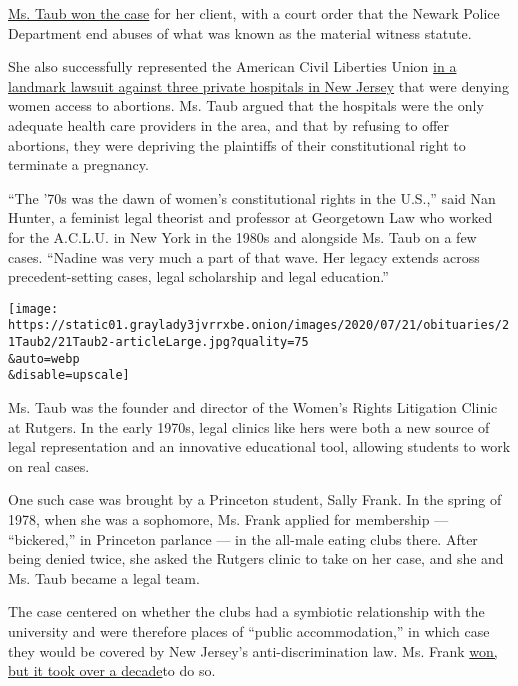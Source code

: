 \href{https://www.nytimes3xbfgragh.onion/1976/11/23/archives/court-moves-to-curb-witnesslaw-abuses-ruling-in-case-of-rape-victim.html}{Ms.
Taub won the case} for her client, with a court order that the Newark
Police Department end abuses of what was known as the material witness
statute.

She also successfully represented the American Civil Liberties Union
\href{https://www.nytimes3xbfgragh.onion/1974/06/08/archives/hearings-wind-up-in-suit-asking-hospital-abortions-rights-violation.html}{in
a landmark lawsuit against three private hospitals in New Jersey} that
were denying women access to abortions. Ms. Taub argued that the
hospitals were the only adequate health care providers in the area, and
that by refusing to offer abortions, they were depriving the plaintiffs
of their constitutional right to terminate a pregnancy.

``The '70s was the dawn of women's constitutional rights in the U.S.,''
said Nan Hunter, a feminist legal theorist and professor at Georgetown
Law who worked for the A.C.L.U. in New York in the 1980s and alongside
Ms. Taub on a few cases. ``Nadine was very much a part of that wave. Her
legacy extends across precedent-setting cases, legal scholarship and
legal education.''

\texttt{[image: https://static01.graylady3jvrrxbe.onion/images/2020/07/21/obituaries/21Taub2/21Taub2-articleLarge.jpg?quality=75\\\&auto=webp\\\&disable=upscale]}

Ms. Taub was the founder and director of the Women's Rights Litigation
Clinic at Rutgers. In the early 1970s, legal clinics like hers were both
a new source of legal representation and an innovative educational tool,
allowing students to work on real cases.

One such case was brought by a Princeton student, Sally Frank. In the
spring of 1978, when she was a sophomore, Ms. Frank applied for
membership --- ``bickered,'' in Princeton parlance --- in the all-male
eating clubs there. After being denied twice, she asked the Rutgers
clinic to take on her case, and she and Ms. Taub became a legal team.

The case centered on whether the clubs had a symbiotic relationship with
the university and were therefore places of ``public accommodation,'' in
which case they would be covered by New Jersey's anti-discrimination
law. Ms. Frank
\href{https://law.justia.com/cases/federal/appellate-courts/F2/943/270/86129/}{won,
but it took over a decade}to do so.

